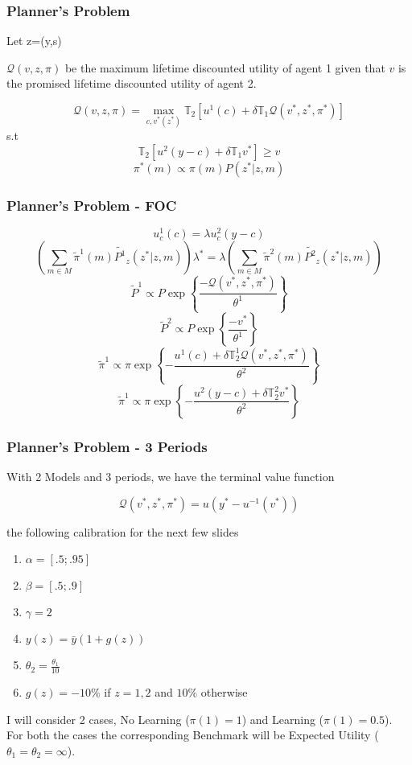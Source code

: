\documentclass{beamer}
\theoremstyle{Definition}
\begin{document}
\begin{frame}
\frametitle{Planner's Problem}
Let z=(y,s)

$\mathcal{Q}(v,z,\pi)$ be the maximum lifetime discounted utility of agent 1 given that $v$ is the promised lifetime discounted utility of agent 2.

\[\mathcal{Q}(v,z,\pi)=\max_{c,v^*(z^*)} \mathbb{T}_2\left[u^1(c)+\delta \mathbb{T}_1 \mathcal{Q}(v^*,z^*,\pi^*)\right]\]
s.t
\[\mathbb{T}_2\left[u^2(y-c)+\delta \mathbb{T}_1 v^*\right]\geq v\] 
\[\pi^*(m)\propto \pi(m)P(z^*|z,m)\]
\end{frame}
\begin{frame}
\frametitle{Planner's Problem - FOC}
\small{
\[u^1_c(c)=\lambda u^2_c(y-c)\]
\[\left(\sum_{m \in M}\tilde{\pi}^1(m)\tilde{P^1}_z(z^* |z,m)\right)\lambda^*=\lambda\left(\sum_{m \in M}\tilde{\pi}^2(m)\tilde{P^2}_z(z^* |z,m)\right) \]
\[\tilde{P}^1 \propto P\exp\left\{\frac{-\mathcal{Q}(v^*,z^*,\pi^*)}{\theta^1}\right\}\]
\[\tilde{P}^2 \propto P\exp\left\{\frac{-v^*}{\theta^1}\right\}\]
\[\tilde{\pi}^1 \propto \pi \exp\left\{-\frac{ u^1(c)+\delta \mathbb{T}^1_2 \mathcal{Q}(v^*,z^*,\pi^*) }{\theta^2}\right\}\]
\[\tilde{\pi}^1 \propto \pi \exp\left\{-\frac{u^2(y-c)+\delta \mathbb{T}^2_2 v^*}{\theta^2}\right\}\]
}
\end{frame}

\begin{frame}
\frametitle{Planner's Problem - 3 Periods}
With 2 Models and 3 periods, we have the terminal value function

\[\mathcal{Q}(v^*,z^*,\pi^*) = u(y^*-u^{-1}(v^*))\]

the following calibration for the next few slides
\begin{enumerate}
	\item $\alpha =[ .5;.95]$
	\item $\beta=[.5;.9]$
	\item $\gamma=2$
	\item $y(z)=\bar{y}(1+g(z))$
	\item $\theta_2=\frac{\theta_1}{10}$
	\item $g(z)=-10\%$ if $z=1,2$ and $10\%$ otherwise
\end{enumerate}

I will consider 2 cases, No Learning ($\pi(1)=1$) and Learning ($\pi(1)=0.5$). For both the cases the corresponding Benchmark will be Expected Utility ($\theta_1=\theta_2=\infty$).


\end{frame}
\end{document}
